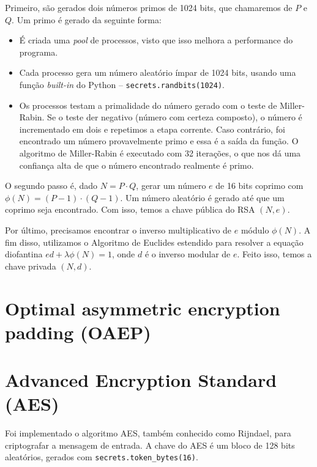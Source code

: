 \documentclass[a4paper, 10.5pt]{article}
\begin{document}
Primeiro, são gerados dois números primos de 1024 bits, que chamaremos de $P$ e
$Q$. Um primo é gerado da seguinte forma:

\begin{itemize}
    \item É criada uma \textit{pool} de processos, visto que isso melhora a
        performance do programa.
    \item Cada processo gera um número aleatório ímpar de 1024 bits, usando uma função
        \textit{built-in} do Python -- \verb|secrets.randbits(1024)|.
    \item Os processos testam a primalidade do número gerado com o teste de
        Miller-Rabin. Se o teste der negativo (número com certeza composto), o
        número é incrementado em dois e repetimos a etapa corrente. Caso
        contrário, foi encontrado um número provavelmente primo e essa é a saída
        da função. O algoritmo de Miller-Rabin é executado com 32 iterações, o
        que nos dá uma confiança alta de que o número encontrado realmente é
        primo.
\end{itemize}

O segundo passo é, dado $N = P \cdot Q$, gerar um número $e$ de 16 bits
coprimo com $ \phi(N) = (P-1) \cdot (Q-1) $. Um número aleatório é gerado até que um coprimo seja
encontrado. Com isso, temos a chave pública do RSA $(N, e)$.  

Por último, precisamos encontrar o inverso multiplicativo de $e$ módulo
$\phi(N)$. A fim disso, utilizamos o Algoritmo de Euclides estendido para
resolver a equação diofantina $ed + \lambda \phi(N) = 1$, onde $d$ é o
inverso modular de $e$. Feito isso, temos a chave privada $(N, d)$.


\section{Optimal asymmetric encryption padding (OAEP)} %
\label{sec:oaep}
    

\section{Advanced Encryption Standard (AES)} %
\label{sec:aes}
Foi implementado o algoritmo AES, também conhecido como Rijndael, para
criptografar a mensagem de entrada. A chave do AES é um bloco de 128 bits
aleatórios, gerados com \verb|secrets.token_bytes(16)|.
\end{document}

